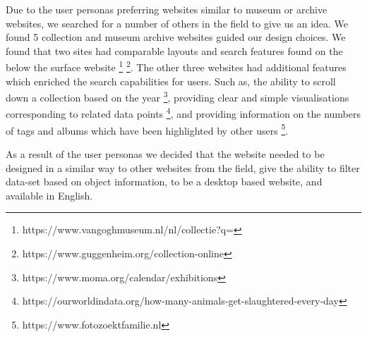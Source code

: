 Due to the user personas preferring websites similar to museum or archive websites, we searched for a number of others in the field to give us an idea.  We found 5 collection and museum archive websites guided our design choices. We found that two sites had comparable layouts and search features found on the below the surface website \footnote{https://www.vangoghmuseum.nl/nl/collectie?q=} \footnote{https://www.guggenheim.org/collection-online}.  The other three websites had additional features which enriched the search capabilities for users. Such as, the ability to scroll down a collection based on the year \footnote{https://www.moma.org/calendar/exhibitions}, providing clear and simple visualisations corresponding to related data points \footnote{https://ourworldindata.org/how-many-animals-get-slaughtered-every-day}, and providing information on the numbers of tags and albums which have been highlighted by other users \footnote{https://www.fotozoektfamilie.nl}.  

As a result of the user personas we decided that the website needed to be designed in a similar way to other websites from the field, give the ability to filter data-set based on object information, to be a desktop based website, and available in English.